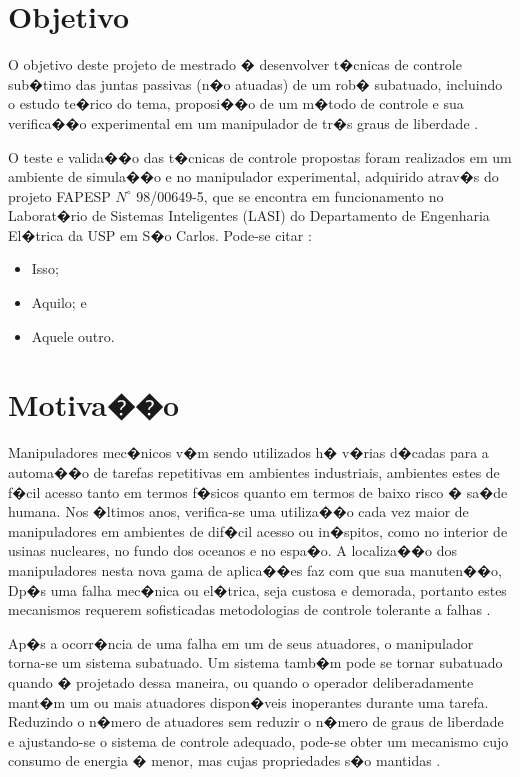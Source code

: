 \section{Objetivo}
O objetivo deste projeto de mestrado � desenvolver t�cnicas de controle sub�timo das juntas passivas (n�o atuadas) de um rob� subatuado, incluindo o estudo te�rico do tema, proposi��o de um m�todo de controle e sua verifica��o
experimental em um manipulador de tr�s graus de liberdade \cite{Nascimento1970}.

O teste \cite{Patagonios2001} e valida��o das t�cnicas de controle propostas foram realizados em um ambiente de simula��o e no manipulador
experimental, adquirido atrav�s do projeto FAPESP $N^{\circ}$ 98/00649-5, que se encontra em funcionamento no Laborat�rio de Sistemas Inteligentes (LASI) do Departamento de Engenharia El�trica da USP em S�o Carlos. Pode-se citar \cite{Furmento1995}:
\begin{itemize}
\item Isso;
\item Aquilo; e
\item Aquele outro.
\end{itemize}
\section{Motiva��o}
Manipuladores mec�nicos \cite{Sbornian2002} v�m sendo utilizados h� v�rias d�cadas para a automa��o de tarefas
repetitivas em ambientes industriais, ambientes estes de f�cil acesso tanto em termos f�sicos quanto em termos de baixo
risco � sa�de humana. Nos �ltimos anos, verifica-se uma utiliza��o cada vez maior de manipuladores em
ambientes de dif�cil acesso ou in�spitos, como no interior de usinas nucleares, no fundo dos oceanos e no
espa�o. A localiza��o dos manipuladores nesta nova gama de aplica��es faz com que sua manuten��o,
Dp�s uma falha mec�nica ou el�trica, seja custosa e demorada, portanto estes mecanismos requerem sofisticadas
metodologias de controle tolerante a falhas \cite{ITALUS2004}.

Ap�s a ocorr�ncia de uma falha em um de seus atuadores, o manipulador torna-se um sistema subatuado. Um sistema tamb�m pode se tornar subatuado quando � projetado  dessa maneira, ou quando o operador deliberadamente mant�m um ou mais atuadores dispon�veis inoperantes durante uma tarefa. Reduzindo o n�mero de atuadores sem reduzir o n�mero de graus de liberdade e ajustando-se o sistema de controle adequado, pode-se obter um mecanismo cujo consumo de energia � menor, mas cujas propriedades s�o mantidas \cite{Arystides1994}.

